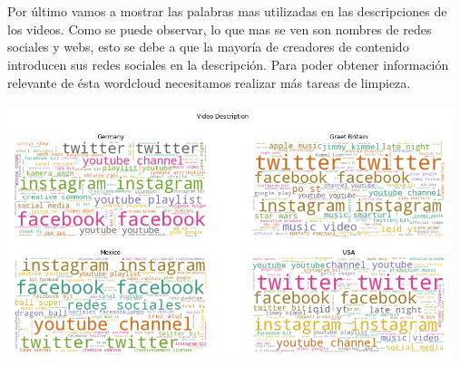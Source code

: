 \documentclass[a4paper,12pt]{article}
\begin{document}
\\
\\
Por \'ultimo vamos a mostrar las palabras mas utilizadas en las descripciones de los videos.
Como se puede observar, lo que mas se ven son nombres de redes sociales y webs, esto se debe a que la mayor\'ia de creadores de contenido introducen sus redes sociales en la descripci\'on. Para poder obtener informaci\'on relevante de \'esta wordcloud necesitamos realizar m\'as tareas de limpieza.
\\
\\
\includegraphics[width=13cm]{wordcould_desc.png}
\end{document}
